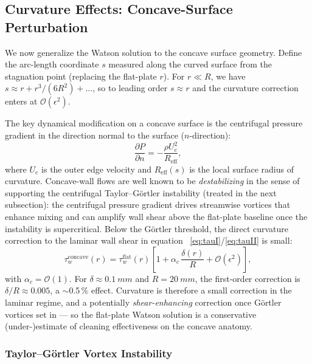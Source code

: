 \documentclass[aps,prfluids,reprint,amsmath,amssymb,floatfix]{revtex4-2}
\newcommand{\order}[1]{\mathcal{O}\!\left(#1\right)}
\begin{document}
\subsection{Curvature Effects: Concave-Surface Perturbation}
\label{subsec:curvature}

We now generalize the Watson solution to the concave surface geometry.
Define the arc-length coordinate $s$ measured along the curved surface from
the stagnation point (replacing the flat-plate $r$). For $r \ll R$, we have
$s \approx r + r^3/(6R^2) + \ldots$, so to leading order $s \approx r$ and
the curvature correction enters at $\mathcal{O}(\epsilon^2)$.

The key dynamical modification on a concave surface is the centrifugal
pressure gradient in the direction normal to the surface ($n$-direction):
\begin{equation}
    \frac{\partial P}{\partial n} = -\frac{\rho U_e^2}{R_\mathrm{eff}},
    \label{eq:centrifugal}
\end{equation}
where $U_e$ is the outer edge velocity and $R_\mathrm{eff}(s)$ is the
local surface radius of curvature. Concave-wall flows are well known to be
\emph{destabilizing} in the sense of supporting the centrifugal
Taylor--G\"ortler instability (treated in the next subsection): the
centrifugal pressure gradient drives streamwise vortices that enhance
mixing and can amplify wall shear above the flat-plate baseline once
the instability is supercritical. Below the G\"ortler threshold, the
direct curvature correction to the laminar wall shear in equation~%
\eqref{eq:tauI}/\eqref{eq:tauII} is small:
\begin{equation}
    \tau_w^\mathrm{concave}(r) = \tau_w^\mathrm{flat}(r)
    \left[1 + \alpha_c\,\frac{\delta(r)}{R} + \mathcal{O}(\epsilon^2)\right],
    \label{eq:curvaturecorrection}
\end{equation}
with $\alpha_c = \order{1}$. For $\delta \approx \SI{0.1}{mm}$ and
$R = \SI{20}{mm}$, the first-order correction is $\delta/R \approx 0.005$,
a $\sim$0.5\,\% effect. Curvature is therefore a small correction in the
laminar regime, and a potentially \emph{shear-enhancing} correction once
G\"ortler vortices set in --- so the flat-plate Watson solution is a
conservative (under-)estimate of cleaning effectiveness on the concave
anatomy.

\subsubsection{Taylor--G\"ortler Vortex Instability}
\end{document}
